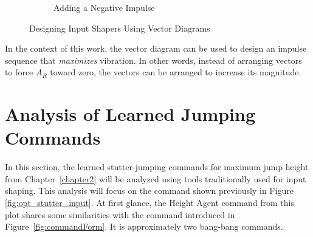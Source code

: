 \begin{figure}[tb!]
\begin{subfigure}[b]{0.45\textwidth}
     \caption{Adding a Negative Impulse}
     \label{fig:vector_design_neg}
  \end{subfigure}
   \caption{Designing Input Shapers Using Vector Diagrams}
   \label{fig:vector_design}
\end{figure} 

In the context of this work, the vector diagram can be used to design an impulse sequence that \textit{maximizes} vibration. In other words, instead of arranging vectors to force $A_R$ toward zero, the vectors can be arranged to increase its magnitude. 


\section{Analysis of Learned Jumping Commands}
\label{sec:comparison_to_shaping}
%
In this section, the learned stutter-jumping commands for maximum jump height from Chapter~\ref{chapter2} will be analyzed using tools traditionally used for input shaping. This analysis will focus on the command shown previously in Figure \ref{fig:opt_stutter_input}. At first glance, the Height Agent command from this plot shares some similarities with the command introduced in Figure~\ref{fig:commandForm}. It is approximately two bang-bang commands.

